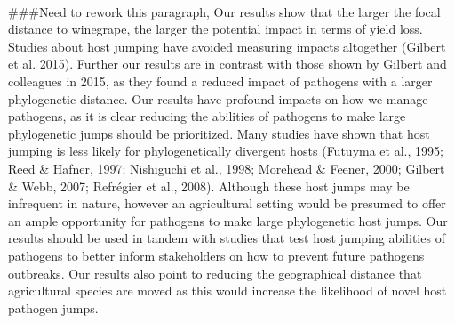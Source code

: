 \documentclass[12pt,letter]{article}
\begin{document}
\paragraph{}###Need to rework this paragraph, Our results show that the larger the focal distance to winegrape, the larger the potential impact in terms of yield loss. Studies about host jumping have avoided measuring impacts altogether (Gilbert et al. 2015). Further our results are in contrast with those shown by Gilbert and colleagues in 2015, as they found a reduced impact of pathogens with a larger phylogenetic distance. Our results have profound impacts on how we manage pathogens, as it is clear reducing the abilities of pathogens to make large phylogenetic jumps should be prioritized. Many studies have shown that host jumping is less likely for phylogenetically divergent hosts (Futuyma et al., 1995; Reed & Hafner, 1997; Nishiguchi et al., 1998; Morehead & Feener, 2000; Gilbert & Webb, 2007; Refrégier et al., 2008). Although these host jumps may be infrequent in nature, however an agricultural setting would be presumed to offer an ample opportunity for pathogens to make large phylogenetic host jumps. Our results should be used in tandem with studies that test host jumping abilities of pathogens to better inform stakeholders on how to prevent future pathogens outbreaks. Our results also point to reducing the geographical distance that agricultural species are moved as this would increase the likelihood of novel host pathogen jumps.    




\end{document}
